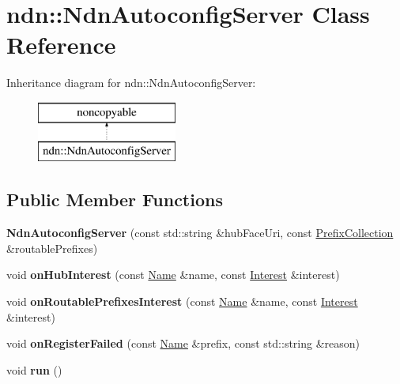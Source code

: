 \hypertarget{classndn_1_1NdnAutoconfigServer}{}\section{ndn\+:\+:Ndn\+Autoconfig\+Server Class Reference}
\label{classndn_1_1NdnAutoconfigServer}
Inheritance diagram for ndn\+:\+:Ndn\+Autoconfig\+Server\+:\begin{figure}[H]
\begin{center}
\leavevmode
\includegraphics[height=2.000000cm]{classndn_1_1NdnAutoconfigServer}
\end{center}
\end{figure}
\subsection*{Public Member Functions}
\begin{DoxyCompactItemize}
\item 
{\bfseries Ndn\+Autoconfig\+Server} (const std\+::string \&hub\+Face\+Uri, const \hyperlink{classndn_1_1PrefixCollection}{Prefix\+Collection} \&routable\+Prefixes)\hypertarget{classndn_1_1NdnAutoconfigServer_a20d32c1b9ae348dd0f3ff970e8e4c740}{}\label{classndn_1_1NdnAutoconfigServer_a20d32c1b9ae348dd0f3ff970e8e4c740}

\item 
void {\bfseries on\+Hub\+Interest} (const \hyperlink{classndn_1_1Name}{Name} \&name, const \hyperlink{classndn_1_1Interest}{Interest} \&interest)\hypertarget{classndn_1_1NdnAutoconfigServer_aac492a8ad8725c389b43ddd06991f2d4}{}\label{classndn_1_1NdnAutoconfigServer_aac492a8ad8725c389b43ddd06991f2d4}

\item 
void {\bfseries on\+Routable\+Prefixes\+Interest} (const \hyperlink{classndn_1_1Name}{Name} \&name, const \hyperlink{classndn_1_1Interest}{Interest} \&interest)\hypertarget{classndn_1_1NdnAutoconfigServer_a20faa44f3c74ff6b5ba8757415adc344}{}\label{classndn_1_1NdnAutoconfigServer_a20faa44f3c74ff6b5ba8757415adc344}

\item 
void {\bfseries on\+Register\+Failed} (const \hyperlink{classndn_1_1Name}{Name} \&prefix, const std\+::string \&reason)\hypertarget{classndn_1_1NdnAutoconfigServer_a864920c08515d50a1956fafd986460d0}{}\label{classndn_1_1NdnAutoconfigServer_a864920c08515d50a1956fafd986460d0}

\item 
void {\bfseries run} ()\hypertarget{classndn_1_1NdnAutoconfigServer_a2a159e9a00a736082783368277b46d6b}{}\label{classndn_1_1NdnAutoconfigServer_a2a159e9a00a736082783368277b46d6b}

\end{DoxyCompactItemize}


